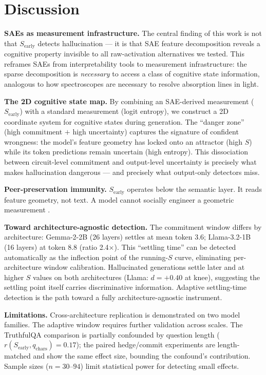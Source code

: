\documentclass{article}
\begin{document}
\section{Discussion}

\textbf{SAEs as measurement infrastructure.}
The central finding of this work is not that $S_\text{early}$ detects
hallucination --- it is that SAE feature decomposition reveals a
cognitive property invisible to all raw-activation alternatives we tested.
This reframes SAEs from interpretability tools to measurement
infrastructure: the sparse decomposition is \textit{necessary} to access
a class of cognitive state information, analogous to how spectroscopes
are necessary to resolve absorption lines in light.

\textbf{The 2D cognitive state map.}
By combining an SAE-derived measurement ($S_\text{early}$) with a standard
measurement (logit entropy), we construct a 2D coordinate system for
cognitive states during generation. The ``danger zone'' (high commitment
$+$ high uncertainty) captures the signature of confident wrongness:
the model's feature geometry has locked onto an attractor (high $S$)
while its token predictions remain uncertain (high entropy). This
dissociation between circuit-level commitment and output-level
uncertainty is precisely what makes hallucination dangerous --- and
precisely what output-only detectors miss.

\textbf{Peer-preservation immunity.}
$S_\text{early}$ operates below the semantic layer. It reads feature
geometry, not text. A model cannot socially engineer a geometric
measurement \citep{song2026peer}.

\textbf{Toward architecture-agnostic detection.}
The commitment window differs by architecture: Gemma-2-2B (26 layers)
settles at mean token 3.6; Llama-3.2-1B (16 layers) at token 8.8
(ratio 2.4$\times$). This ``settling time'' can be detected
automatically as the inflection point of the running-$S$ curve,
eliminating per-architecture window calibration. Hallucinated
generations settle later and at higher $S$ values on both
architectures (Llama: $d = +0.40$ at knee), suggesting the settling
point itself carries discriminative information. Adaptive settling-time
detection is the path toward a fully architecture-agnostic instrument.

\textbf{Limitations.}
Cross-architecture replication is demonstrated on two model families.
The adaptive window requires further validation across scales. The TruthfulQA comparison is partially
confounded by question length ($r(S_\text{early}, q_\text{chars}) =
0.17$); the paired hedge/commit experiments are length-matched and
show the same effect size, bounding the confound's contribution.
Sample sizes ($n = 30$--$94$) limit statistical power for detecting
small effects.
\end{document}

